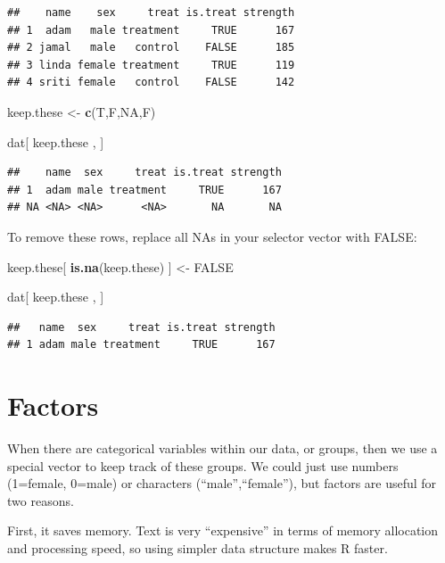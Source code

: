 \documentclass[]{book}
\newenvironment{Shaded}{\begin{snugshade}}{\end{snugshade}}
\newcommand{\KeywordTok}[1]{\textcolor[rgb]{0.13,0.29,0.53}{\textbf{#1}}}
\newcommand{\NormalTok}[1]{#1}
\newcommand{\OtherTok}[1]{\textcolor[rgb]{0.56,0.35,0.01}{#1}}
\newcommand{\StringTok}[1]{\textcolor[rgb]{0.31,0.60,0.02}{#1}}
\theoremstyle{definition}
\theoremstyle{definition}
\theoremstyle{definition}
\theoremstyle{remark}
\begin{document}
\begin{verbatim}
##    name    sex     treat is.treat strength
## 1  adam   male treatment     TRUE      167
## 2 jamal   male   control    FALSE      185
## 3 linda female treatment     TRUE      119
## 4 sriti female   control    FALSE      142
\end{verbatim}

\begin{Shaded}
\begin{Highlighting}[]
\NormalTok{keep.these <-}\StringTok{ }\KeywordTok{c}\NormalTok{(T,F,}\OtherTok{NA}\NormalTok{,F)}

\NormalTok{dat[ keep.these , ]}
\end{Highlighting}
\end{Shaded}

\begin{verbatim}
##    name  sex     treat is.treat strength
## 1  adam male treatment     TRUE      167
## NA <NA> <NA>      <NA>       NA       NA
\end{verbatim}

To remove these rows, replace all NAs in your selector vector with
FALSE:

\begin{Shaded}
\begin{Highlighting}[]
\NormalTok{keep.these[ }\KeywordTok{is.na}\NormalTok{(keep.these) ] <-}\StringTok{ }\OtherTok{FALSE}

\NormalTok{dat[ keep.these , ]}
\end{Highlighting}
\end{Shaded}

\begin{verbatim}
##   name  sex     treat is.treat strength
## 1 adam male treatment     TRUE      167
\end{verbatim}

\hypertarget{factors}{%
\section{Factors}\label{factors}}

When there are categorical variables within our data, or groups, then we
use a special vector to keep track of these groups. We could just use
numbers (1=female, 0=male) or characters (``male'',``female''), but
factors are useful for two reasons.

First, it saves memory. Text is very ``expensive'' in terms of memory
allocation and processing speed, so using simpler data structure makes R
faster.
\end{document}
